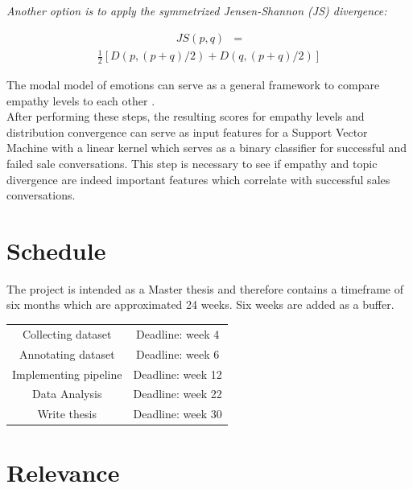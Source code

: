 \documentclass[twoside]{article}
\begin{document}
\begin{multicols}{2}
\textit{Another option is to apply the symmetrized Jensen-Shannon (JS) divergence:}

\begin{align*}
	JS(p,q) &= 
\end{align*}
\vspace{-20 pt}
\begin{align}
	 \frac{1}{2} [D(p,(p + q)/2) + D(q, (p + q)/2)]
\end{align}


The modal model of emotions can serve as a general framework to compare empathy levels to each other \cite{Alam2017}.\\

After performing these steps, the resulting scores for empathy levels and distribution convergence can serve as input features for a Support Vector Machine with a linear kernel which serves as a binary classifier for successful and failed sale conversations. This step is necessary to see if empathy and topic divergence are indeed important features which correlate with successful sales conversations.


\section{Schedule}

The project is intended as a Master thesis and therefore contains a timeframe of six months which are approximated 24 weeks. Six weeks are added as a buffer.

\begin{center}
\begin{tabular}{ |c|c| } 
 \hline
Collecting dataset & Deadline: week 4 \\ 
Annotating dataset & Deadline: week 6 \\ 
Implementing pipeline & Deadline: week 12 \\
Data Analysis & Deadline: week 22 \\
Write thesis & Deadline: week 30 \\ 
 \hline
\end{tabular}
\end{center}
 


\section{Relevance}


\end{multicols}
\end{document}
